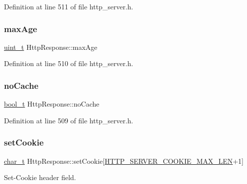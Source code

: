 Definition at line 511 of file http\+\_\+server.\+h.

\mbox{\label{structHttpResponse_a81dcedfb48458b36d8c6909a1ec71b25}} 
\subsubsection{\texorpdfstring{max\+Age}{maxAge}}
{\footnotesize\ttfamily \hyperlink{compiler__port_8h_a12a1e9b3ce141648783a82445d02b58d}{uint\+\_\+t} Http\+Response\+::max\+Age}



Definition at line 510 of file http\+\_\+server.\+h.

\mbox{\label{structHttpResponse_a0a2cc8326bd2fe070e0981ae3d5bfc2b}} 
\subsubsection{\texorpdfstring{no\+Cache}{noCache}}
{\footnotesize\ttfamily \hyperlink{compiler__port_8h_a812d16e5494522586b3784e55d479912}{bool\+\_\+t} Http\+Response\+::no\+Cache}



Definition at line 509 of file http\+\_\+server.\+h.

\mbox{\label{structHttpResponse_a1df2ec2b99d15a5b061673a805da9342}} 
\subsubsection{\texorpdfstring{set\+Cookie}{setCookie}}
{\footnotesize\ttfamily \hyperlink{compiler__port_8h_a40bb5262bf908c328fbcfbe5d29d0201}{char\+\_\+t} Http\+Response\+::set\+Cookie\mbox{[}\hyperlink{http__server_8h_ad5dfb8361753ec3dc34f805ed450fc4e}{H\+T\+T\+P\+\_\+\+S\+E\+R\+V\+E\+R\+\_\+\+C\+O\+O\+K\+I\+E\+\_\+\+M\+A\+X\+\_\+\+L\+EN}+1\mbox{]}}



Set-\/\+Cookie header field. 



